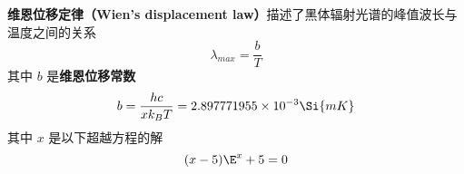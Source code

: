 
\textbf{维恩位移定律（Wien's displacement law）}描述了黑体辐射光谱的峰值波长与温度之间的关系
\begin{equation}
\lambda_{max} = \frac{b}{T}
\end{equation}
其中 $b$ 是\textbf{维恩位移常数}
\begin{equation}
b = \frac{hc}{xk_B T} = 2.897771955\times 10^{-3} \Si{mK}
\end{equation}
其中 $x$ 是以下超越方程的解
\begin{equation}
(x-5)\E^x + 5 = 0
\end{equation}
